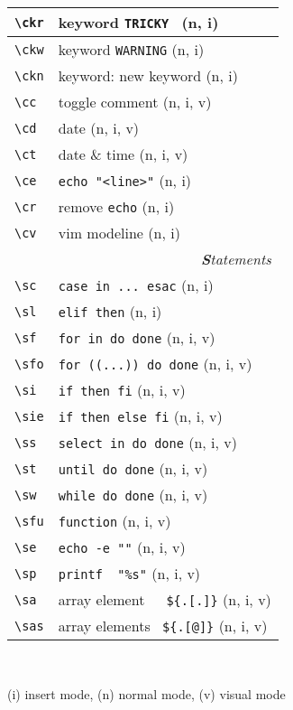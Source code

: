 \documentclass[oneside,12pt,a4paper,DIV18]{scrartcl}
\begin{document}
\begin{center}
\begin{tabular}[]{|p{11mm}|p{59mm}|}
\hline \verb'\ckr' & keyword \verb'TRICKY '           \hfill (n, i) \\
\hline \verb'\ckw' & keyword \verb'WARNING'           \hfill (n, i) \\
\hline \verb'\ckn' & keyword: new keyword             \hfill (n, i) \\
\hline \verb'\cc'  & toggle comment                   \hfill (n, i, v) \\
\hline \verb'\cd'  & date                             \hfill (n, i, v) \\
\hline \verb'\ct'  & date \& time                     \hfill (n, i, v) \\
\hline \verb'\ce'  & \verb'echo "<line>"'             \hfill (n, i) \\
\hline \verb'\cr'  & remove \verb'echo'               \hfill (n, i) \\
\hline \verb'\cv'  & vim modeline                     \hfill (n, i) \\
\hline 
\hline
\multicolumn{2}{|r|}{\textsl{\textbf{S}tatements}} \\
\hline \verb'\sc'  & \verb'case in ... esac'            \hfill (n, i) \\
\hline \verb'\sl'  & \verb'elif then'                   \hfill (n, i) \\
\hline \verb'\sf'  & \verb'for in do done'              \hfill (n, i, v)\\
\hline \verb'\sfo' & \verb'for ((...)) do done'         \hfill (n, i, v)\\
\hline \verb'\si'  & \verb'if then fi'                  \hfill (n, i, v)\\
\hline \verb'\sie' & \verb'if then else fi'             \hfill (n, i, v)\\
\hline \verb'\ss'  & \verb'select in do done'           \hfill (n, i, v)\\
\hline \verb'\st'  & \verb'until do done'               \hfill (n, i, v)\\
\hline \verb'\sw'  & \verb'while do done'               \hfill (n, i, v)\\
\hline \verb'\sfu' & \verb'function'                    \hfill (n, i, v)\\
\hline \verb'\se'  & \verb'echo -e ""'                  \hfill (n, i, v)\\
\hline \verb'\sp'  & \verb'printf  "%s"'                \hfill (n, i, v)\\
\hline \verb'\sa'  & array element\ \ \ \verb'${.[.]}'  \hfill (n, i, v)\\
\hline \verb'\sas' & array elements \ \verb'${.[@]}'    \hfill (n, i, v)\\
\hline
\end{tabular} \\
\begin{flushleft}
{\small
{\normalsize (i)} insert mode, {\normalsize (n)} normal mode, {\normalsize (v)} visual mode
}%
\end{flushleft}


\end{center}
\end{document}
